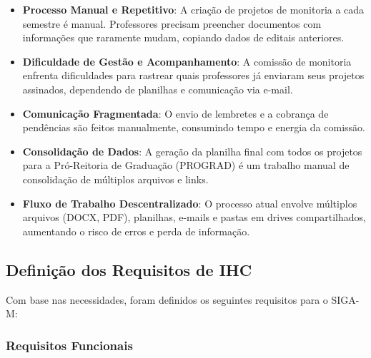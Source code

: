 \documentclass[12pt, a4paper]{report}
\begin{document}
\begin{itemize}
    \item \textbf{Processo Manual e Repetitivo}: A criação de projetos de monitoria a cada semestre é manual. Professores precisam preencher documentos com informações que raramente mudam, copiando dados de editais anteriores.
    
    \item \textbf{Dificuldade de Gestão e Acompanhamento}: A comissão de monitoria enfrenta dificuldades para rastrear quais professores já enviaram seus projetos assinados, dependendo de planilhas e comunicação via e-mail.
    
    \item \textbf{Comunicação Fragmentada}: O envio de lembretes e a cobrança de pendências são feitos manualmente, consumindo tempo e energia da comissão.
    
    \item \textbf{Consolidação de Dados}: A geração da planilha final com todos os projetos para a Pró-Reitoria de Graduação (PROGRAD) é um trabalho manual de consolidação de múltiplos arquivos e links.
    
    \item \textbf{Fluxo de Trabalho Descentralizado}: O processo atual envolve múltiplos arquivos (DOCX, PDF), planilhas, e-mails e pastas em drives compartilhados, aumentando o risco de erros e perda de informação.
\end{itemize}

\subsection{Definição dos Requisitos de IHC}

Com base nas necessidades, foram definidos os seguintes requisitos para o SIGA-M:

\subsubsection{Requisitos Funcionais}
\end{document}
